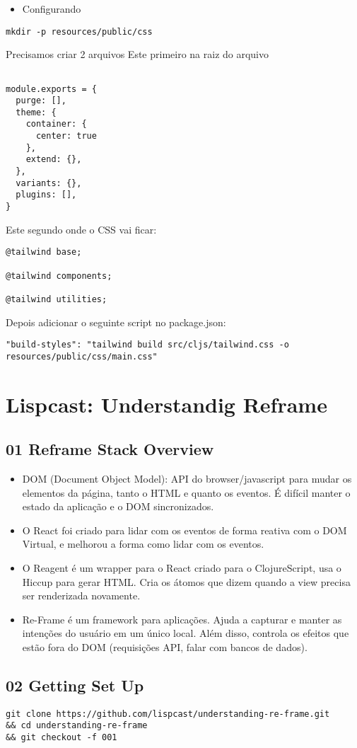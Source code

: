 \documentclass[11pt]{article}
\begin{document}
\begin{itemize}
\item Configurando
\end{itemize}
\begin{verbatim}
mkdir -p resources/public/css

\end{verbatim}

Precisamos criar 2 arquivos
Este primeiro na raiz do arquivo
\begin{verbatim}

module.exports = {
  purge: [],
  theme: {
    container: {
      center: true
    },
    extend: {},
  },
  variants: {},
  plugins: [],
}

\end{verbatim}

Este segundo onde o CSS vai ficar:

\begin{verbatim}
@tailwind base;

@tailwind components;

@tailwind utilities;
\end{verbatim}

Depois adicionar o seguinte script no package.json:

\begin{verbatim}
"build-styles": "tailwind build src/cljs/tailwind.css -o resources/public/css/main.css"
\end{verbatim}



\section{Lispcast: Understandig Reframe}
\label{sec:org3df8718}
\subsection{01 Reframe Stack Overview}
\label{sec:org37570a8}
\begin{itemize}
\item DOM (Document Object Model): API do browser/javascript para mudar os elementos da página, tanto o HTML e quanto os eventos. É difícil manter o estado da aplicação e o DOM sincronizados.

\item O React foi criado para lidar com os eventos de forma reativa com o DOM Virtual, e melhorou a forma como lidar com os eventos.

\item O Reagent é um wrapper para o React criado para o ClojureScript, usa o Hiccup para gerar HTML. Cria os átomos que dizem quando a view precisa ser renderizada novamente.

\item Re-Frame é um framework para aplicações. Ajuda a capturar e manter as intenções do usuário em um único local. Além disso, controla os efeitos que estão fora do DOM (requisições API, falar com bancos de dados).
\end{itemize}
\subsection{02 Getting Set Up}
\label{sec:orgc30e97d}
\begin{verbatim}
git clone https://github.com/lispcast/understanding-re-frame.git
&& cd understanding-re-frame
&& git checkout -f 001
\end{verbatim}
\end{document}
